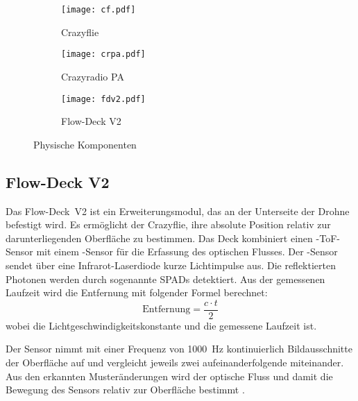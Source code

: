 \begin{figure}[H]
    \centering
    \begin{imgbox}
        \begin{subfigure}[b]{0.3\textwidth}
            \centering
            \texttt{[image: cf.pdf]}
            \caption{Crazyflie  \cite{bc:cf20}}
            \label{pic:cf20}
        \end{subfigure}
        \hfill
        \begin{subfigure}[b]{0.3\textwidth}
            \centering
            \texttt{[image: crpa.pdf]}
            \caption{Crazyradio PA \cite{bc:crpa}}
            \label{pic:crpa}
        \end{subfigure}
        \hfill
        \begin{subfigure}[b]{0.3\textwidth}
            \centering
            \texttt{[image: fdv2.pdf]}
            \caption{Flow-Deck V2 \cite{bc:fdv2}}
            \label{pic:fdv2}
        \end{subfigure}
    \end{imgbox}
    \caption{Physische Komponenten}
        \label{fig:drohne_und_radio}
\end{figure}

\subsection{Flow-Deck V2}
\label{sub:v2}

Das Flow-Deck~V2 ist ein Erweiterungsmodul, das an der Unterseite der Drohne befestigt wird.
Es ermöglicht der Crazyflie, ihre absolute Position relativ zur darunterliegenden Oberfläche zu bestimmen.
Das Deck kombiniert einen -ToF-Sensor\footnotemark{} mit einem -Sensor für die Erfassung des optischen Flusses.
Der -Sensor sendet über eine Infrarot-Laserdiode kurze Lichtimpulse aus.
Die reflektierten Photonen werden durch sogenannte SPADs\footnotemark{} detektiert. 
Aus der gemessenen Laufzeit wird die Entfernung mit folgender Formel berechnet:
\[
\text{Entfernung} = \frac{c \cdot t}{2}
\]
wobei  die Lichtgeschwindigkeitskonstante und  die gemessene Laufzeit ist.

Der  Sensor nimmt mit einer Frequenz von \SI{1000}{\hertz} kontinuierlich Bildausschnitte der Oberfläche auf und vergleicht jeweils zwei aufeinanderfolgende miteinander.
Aus den erkannten Musteränderungen wird der optische Fluss und damit die Bewegung des Sensors relativ zur Oberfläche bestimmt \cite{bc:fdv2_specs}.

